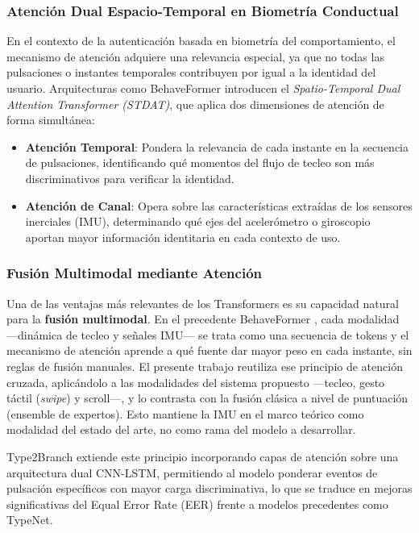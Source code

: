 \subsubsection{Atención Dual Espacio-Temporal en Biometría Conductual}

En el contexto de la autenticación basada en biometría del comportamiento, 
el mecanismo de atención adquiere una relevancia especial, ya que no todas 
las pulsaciones o instantes temporales contribuyen por igual a la identidad 
del usuario. Arquitecturas como BehaveFormer \cite{senerath2023behaveformer} 
introducen el \textit{Spatio-Temporal Dual Attention Transformer (STDAT)}, 
que aplica dos dimensiones de atención de forma simultánea:

\begin{itemize}
    \item \textbf{Atención Temporal}: Pondera la relevancia de cada instante 
    en la secuencia de pulsaciones, identificando qué momentos del flujo de 
    tecleo son más discriminativos para verificar la identidad.
    
    \item \textbf{Atención de Canal}: Opera sobre las características 
    extraídas de los sensores inerciales (IMU), determinando qué ejes del 
    acelerómetro o giroscopio aportan mayor información identitaria en cada 
    contexto de uso.
\end{itemize}

\subsubsection{Fusión Multimodal mediante Atención}

Una de las ventajas más relevantes de los Transformers es 
su capacidad natural para la \textbf{fusión multimodal}. En el precedente 
BehaveFormer \cite{senerath2023behaveformer}, cada modalidad ---dinámica de 
tecleo y señales IMU--- se trata como una secuencia de tokens y el mecanismo 
de atención aprende a qué fuente dar mayor peso en cada instante, sin reglas 
de fusión manuales. El presente trabajo reutiliza ese principio de atención 
cruzada, aplicándolo a las modalidades del sistema propuesto ---tecleo, gesto táctil (\textit{swipe})
y scroll---, y lo contrasta con la fusión clásica a nivel de 
puntuación (ensemble de expertos). Esto mantiene la IMU en el marco teórico 
como modalidad del estado del arte, no como rama del modelo a desarrollar.

Type2Branch \cite{gonzalez2025type2branch} extiende este principio 
incorporando capas de atención sobre una arquitectura dual CNN-LSTM, 
permitiendo al modelo ponderar eventos de pulsación específicos con mayor 
carga discriminativa, lo que se traduce en mejoras significativas del 
Equal Error Rate (EER) frente a modelos precedentes como TypeNet.

